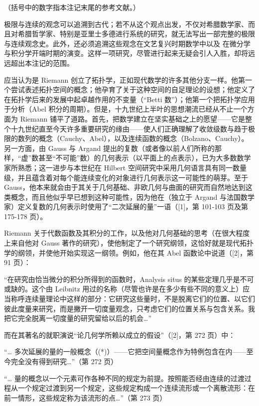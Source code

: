 
（括号中的数字指本注记末尾的参考文献。）

极限与连续的观念可以追溯到古代；若不从这个观点出发，不仅对希腊数学家、而且对希腊哲学家、特别是亚里士多德进行系统的研究，就无法写出一部完整的极限与连续观念史。此外，还必须追溯这些观念在文艺复兴时期数学中以及 在微分学与积分学开端时期的演变。这样一项研究，尽管进行起来无疑会引人入胜，却将远远超出本注记的范围。

应当认为是 Riemann 创立了拓扑学，正如现代数学的许多其他分支一样。他第一个尝试表述拓扑空间的概念；他孕育了关于这种空间的自足理论的设想；他定义了在拓扑学后来的发展中起卓越作用的不变量（“Betti 数”）；他第一个把拓扑学应用于分析（Abel 积分的周期）。但是，十九世纪上半叶的思想潮流已经从不止一个方面为 Riemann 铺平了道路。首先，把数学建立在坚实基础之上的愿望——它是整个十九世纪直至今天许多重要研究的缘由——使人们正确理解了收敛级数与趋于极限的数列的概念（Cauchy、Abel），以及连续函数的概念（Bolzano、Cauchy）。另一方面，由 Gauss 与 Argand 提出的复数（或者像以前人们所称的那样，“虚”数甚至“不可能”数）的几何表示（以平面上的点表示），已为大多数数学家所熟悉；这一进步与本世纪在 Hilbert 空间研究中采用几何语言具有同一数量级，并且蕴含着对每个能连续变化的对象进行几何表示这一可能性的萌芽。至于 Gauss，他本来就会由于其关于几何基础、非欧几何与曲面的研究而自然地达到这类概念，而且他似乎早已想到这种可能性，因为他在（独立于 Argand 与法国数学家）定义复数的几何表示时使用了“二次延展的量”一语（{[}1{]}，第 101-103 页及第 175-178 页）。

Riemann 关于代数函数及其积分的工作，以及他对几何基础的思考（在很大程度上来自他对 Gauss 著作的研究），使他制定了一个研究纲领，这恰好就是现代拓扑学的纲领，并使他开始实现这一纲领。例如，他在其 Abel 函数论中说道（{[}2{]}，第 91 页）：

“在研究由恰当微分的积分所得到的函数时，Analysis situs 的某些定理几乎是不可或缺的。这个由 Leibnitz 用过的名称（尽管也许是在多少有些不同的意义上）应当称呼连续量理论中这样的部分：它研究这些量时，不是脱离它们的位置、以它们彼此度量来研究，而是撇开一切度量观念，只考虑它们的位置关系与包含关系。我把它完全脱离一切度量的研究留给以后的机会\ldots{}”

而在其著名的就职演说“论几何学所赖以成立的假设”（{[}2{]}，第 272 页）中：

“\ldots{} 多次延展的量的一般概念（(*)）——它把空间量概念作为特例包含在内——至今完全没有得到研究\ldots”（第 272 页）

“\ldots{} 量的概念以一个元素可作各种不同的规定为前提。按照能否经由连续的过渡过程从一个规定过渡到另一个规定，这些规定构成一个连续流形或一个离散流形：在前一情形，这些规定称为该流形的点\ldots”（第 273 页）

